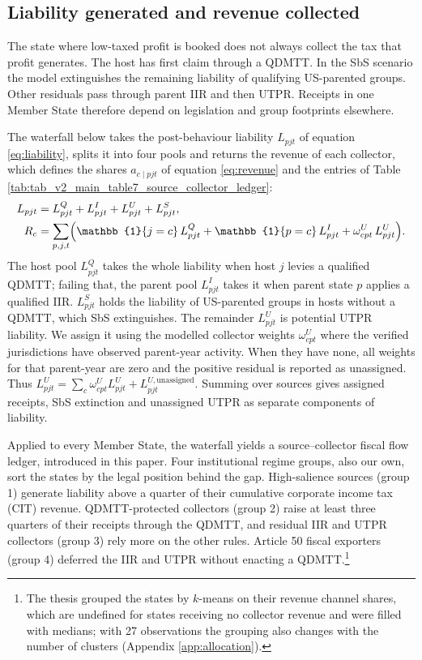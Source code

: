 \documentclass[11pt,a4paper]{article}
\begin{document}
\subsection{Liability generated and revenue collected}\label{sec:ledger}

The state where low-taxed profit is booked does not always collect the tax that profit generates. The host has first claim through a QDMTT. In the SbS scenario the model extinguishes the remaining liability of qualifying US-parented groups. Other residuals pass through parent IIR and then UTPR. Receipts in one Member State therefore depend on legislation and group footprints elsewhere.

The waterfall below takes the post-behaviour liability $L_{pjt}$ of equation \eqref{eq:liability}, splits it into four pools and returns the revenue of each collector, which defines the shares $a_{c\mid pjt}$ of equation \eqref{eq:revenue} and the entries of Table \ref{tab:tab_v2_main_table7_source_collector_ledger}:
\begin{align}
L_{pjt} &= L^{Q}_{pjt} + L^{I}_{pjt} + L^{U}_{pjt} + L^{S}_{pjt}, \label{eq:waterfall}\\
R_c &= \sum_{p,j,t}\Bigl(\mathbb{1}\{j=c\}\,L^{Q}_{pjt} + \mathbb{1}\{p=c\}\,L^{I}_{pjt} + \omega^{U}_{cpt}\,L^{U}_{pjt}\Bigr). \label{eq:collectors}
\end{align}
The host pool $L^{Q}_{pjt}$ takes the whole liability when host $j$ levies a qualified QDMTT; failing that, the parent pool $L^{I}_{pjt}$ takes it when parent state $p$ applies a qualified IIR. $L^{S}_{pjt}$ holds the liability of US-parented groups in hosts without a QDMTT, which SbS extinguishes. The remainder $L^{U}_{pjt}$ is potential UTPR liability. We assign it using the modelled collector weights $\omega^{U}_{cpt}$ where the verified jurisdictions have observed parent-year activity. When they have none, all weights for that parent-year are zero and the positive residual is reported as unassigned. Thus $L^{U}_{pjt} = \sum_c \omega^{U}_{cpt}L^{U}_{pjt} + L^{U,\mathrm{unassigned}}_{pjt}$. Summing over sources gives assigned receipts, SbS extinction and unassigned UTPR as separate components of liability.

Applied to every Member State, the waterfall yields a source–collector fiscal flow ledger, introduced in this paper. Four institutional regime groups, also our own, sort the states by the legal position behind the gap. High-salience sources (group 1) generate liability above a quarter of their cumulative corporate income tax (CIT) revenue. QDMTT-protected collectors (group 2) raise at least three quarters of their receipts through the QDMTT, and residual IIR and UTPR collectors (group 3) rely more on the other rules. Article 50 fiscal exporters (group 4) deferred the IIR and UTPR without enacting a QDMTT.\footnote{The thesis grouped the states by $k$-means on their revenue channel shares, which are undefined for states receiving no collector revenue and were filled with medians; with 27 observations the grouping also changes with the number of clusters (Appendix \ref{app:allocation}).}
\end{document}
